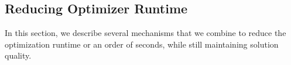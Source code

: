 
\subsection{Reducing Optimizer Runtime}
\label{ss:approximations}

In this section, we describe several mechanisms that we combine to reduce the optimization runtime or an order of seconds, while still maintaining solution quality. 


